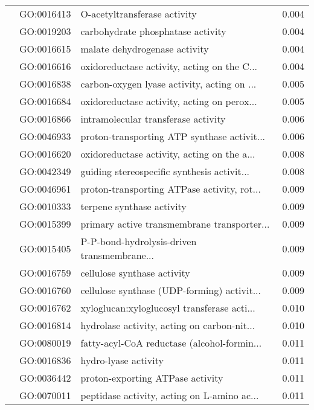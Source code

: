\begin{longtable}{lllr}
   & GO:0016413 &                 O-acetyltransferase activity &         0.004 \\
   & GO:0019203 &            carbohydrate phosphatase activity &         0.004 \\
   & GO:0016615 &                malate dehydrogenase activity &         0.004 \\
   & GO:0016616 &  oxidoreductase activity, acting on the C... &         0.004 \\
   & GO:0016838 &  carbon-oxygen lyase activity, acting on ... &         0.005 \\
   & GO:0016684 &  oxidoreductase activity, acting on perox... &         0.005 \\
   & GO:0016866 &          intramolecular transferase activity &         0.006 \\
   & GO:0046933 &  proton-transporting ATP synthase activit... &         0.006 \\
   & GO:0016620 &  oxidoreductase activity, acting on the a... &         0.008 \\
   & GO:0042349 &  guiding stereospecific synthesis activit... &         0.008 \\
   & GO:0046961 &  proton-transporting ATPase activity, rot... &         0.009 \\
   & GO:0010333 &                    terpene synthase activity &         0.009 \\
   & GO:0015399 &  primary active transmembrane transporter... &         0.009 \\
   & GO:0015405 &  P-P-bond-hydrolysis-driven transmembrane... &         0.009 \\
   & GO:0016759 &                  cellulose synthase activity &         0.009 \\
   & GO:0016760 &  cellulose synthase (UDP-forming) activit... &         0.009 \\
   & GO:0016762 &  xyloglucan:xyloglucosyl transferase acti... &         0.010 \\
   & GO:0016814 &  hydrolase activity, acting on carbon-nit... &         0.010 \\
   & GO:0080019 &  fatty-acyl-CoA reductase (alcohol-formin... &         0.011 \\
   & GO:0016836 &                         hydro-lyase activity &         0.011 \\
   & GO:0036442 &             proton-exporting ATPase activity &         0.011 \\
   & GO:0070011 &  peptidase activity, acting on L-amino ac... &         0.011 \\

\end{longtable}
